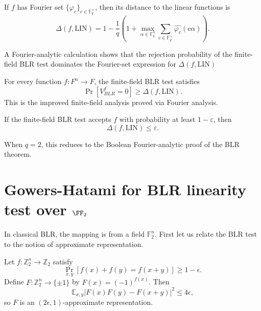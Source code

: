 \begin{lemma}
    \label{lem:ff-distance-to-linearity}
    If $f$ has Fourier set $\{\varphi_c\}_{c \in \mathbb{F}_q^\times}$,
  then its distance to the linear functions is
  \[
    \Delta(f,\mathrm{LIN})
    = 1 - \frac{1}{q}\left(1 + \max_{\alpha \in \mathbb{F}_q^n}
      \sum_{c \in \mathbb{F}_q^\times} \widehat{\varphi_c}(c\alpha)\right).
  \]
\end{lemma}

\begin{lemma}
    \label{lem:ff-spectral-bound}
A Fourier-analytic calculation shows that the rejection probability
  of the finite-field BLR test dominates the Fourier-set expression for
  $\Delta(f,\mathrm{LIN})$
\end{lemma}

\begin{lemma}
    \label{thm:ff-blr-improved-analysis}
For every function $f : F^n \to F$, the finite-field BLR test
  satisfies
  \[
    \Pr[V_{BLR}^f = 0] \ge \Delta(f,\mathrm{LIN}).
  \]
  This is the improved finite-field analysis proved via Fourier analysis.
\end{lemma}

\begin{lemma}
    \label{cor:ff-high-acceptance-close-to-linear}
If the finite-field BLR test accepts $f$ with probability at least
  $1 - \varepsilon$, then
  \[
    \Delta(f,\mathrm{LIN}) \le \varepsilon.
  \]
\end{lemma}

\begin{lemma}
    \label{rem:q2-special-case}
    When $q = 2$, this reduces to the Boolean Fourier-analytic proof
  of the BLR theorem.
\end{lemma}

\section{Gowers-Hatami for BLR linearity test over $\FF_2$}

In classical BLR, the mapping is from a field $\mathbb{F}_2^n$. 
First let us relate the BLR test to the notion of approximate representation.

\begin{proposition}\label{lem:blr-approx-rep}
Let $f:\mathbb{Z}_2^n\to \mathbb{Z}_2$ satisfy
\[
\Pr_{x,y}[f(x)+f(y)=f(x+y)] \ge 1-\epsilon.
\]
Define $F:\mathbb{Z}_2^n\to \{\pm1\}$ by $F(x)=(-1)^{f(x)}$. Then
\[
\mathbb{E}_{x,y}\big|F(x)F(y)-F(x+y)\big|^2 \le 4\epsilon,
\]
so $F$ is an $(2\epsilon,1)$-approximate representation.
\end{proposition}

